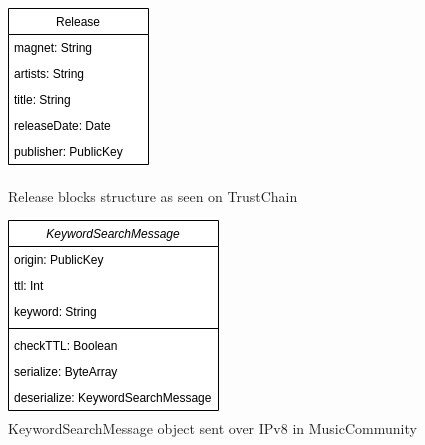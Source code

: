 \begin{figure}
        \includegraphics[width=\linewidth]{design/release-model.png}
        \caption{Release blocks structure as seen on TrustChain}
        \label{fig:release-model}
    \endminipage\hfill
        \includegraphics[width=\linewidth]{design/KeywordSearchMessage-model.png}
        \caption{KeywordSearchMessage object sent over IPv8 in MusicCommunity}
        \label{fig:keyword-search-message-model}
    \endminipage\hfill
    \endminipage
\end{figure}


